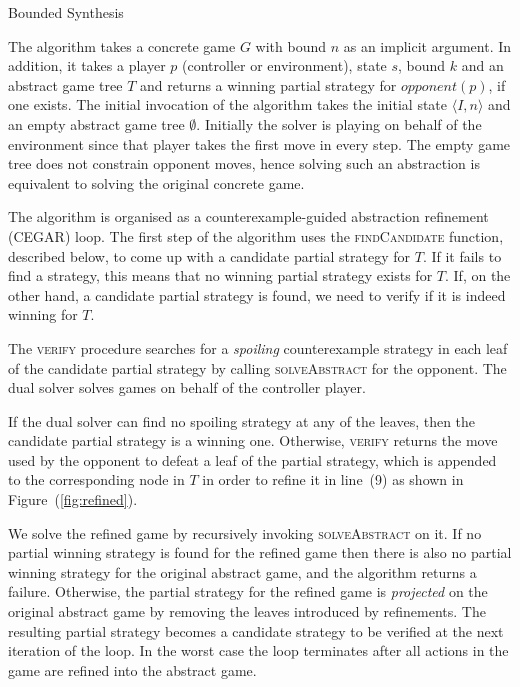 \documentclass{llncs}
\begin{document}
\begin{algorithm}
    \caption{Bounded Synthesis}
    \label{alg:bounded}
\end{algorithm}

The algorithm takes a concrete game $G$ with bound $n$ as an implicit argument.
In addition, it takes a player $p$ (controller or environment), state $s$,
bound $k$ and an abstract game tree $T$ and returns a winning partial strategy
for $opponent(p)$, if one exists.  The initial invocation of the algorithm
takes the initial state $\langle I, n\rangle$ and an empty abstract game tree
$\emptyset$.  Initially the solver is playing on behalf of the environment
since that player takes the first move in every step.  The empty game tree does
not constrain opponent moves, hence solving such an abstraction is equivalent
to solving the original concrete game.

The algorithm is organised as a counterexample-guided abstraction refinement
(CEGAR) loop.  The first step of the algorithm uses the \textsc{findCandidate}
function, described below, to come up with a candidate partial strategy for
$T$. If it fails to find a strategy, this means that no winning partial
strategy exists for $T$.  If, on the other hand, a candidate partial strategy
is found, we need to verify if it is indeed winning for $T$.

The \textsc{verify} procedure searches for a \emph{spoiling} counterexample
strategy in each leaf of the candidate partial strategy by calling
\textsc{solveAbstract} for the opponent. The dual solver solves games on behalf
of the controller player.  

If the dual solver can find no spoiling strategy at any of the leaves, then the
candidate partial strategy is a winning one. Otherwise, \textsc{verify} returns
the move used by the opponent to defeat a leaf of the partial strategy, which
is appended to the corresponding node in $T$ in order to refine it in line~(9)
as shown in Figure~(\ref{fig:refined}).

We solve the refined game by recursively invoking \textsc{solveAbstract} on it.
If no partial winning strategy is found for the refined game then there is also
no partial winning strategy for the original abstract game, and the algorithm
returns a failure.  Otherwise, the partial strategy for the refined game is
\emph{projected} on the original abstract game by removing the leaves
introduced by refinements. The resulting partial strategy becomes a candidate
strategy to be verified at the next iteration of the loop. In the worst case
the loop terminates after all actions in the game are refined into the abstract
game.
\end{document}
